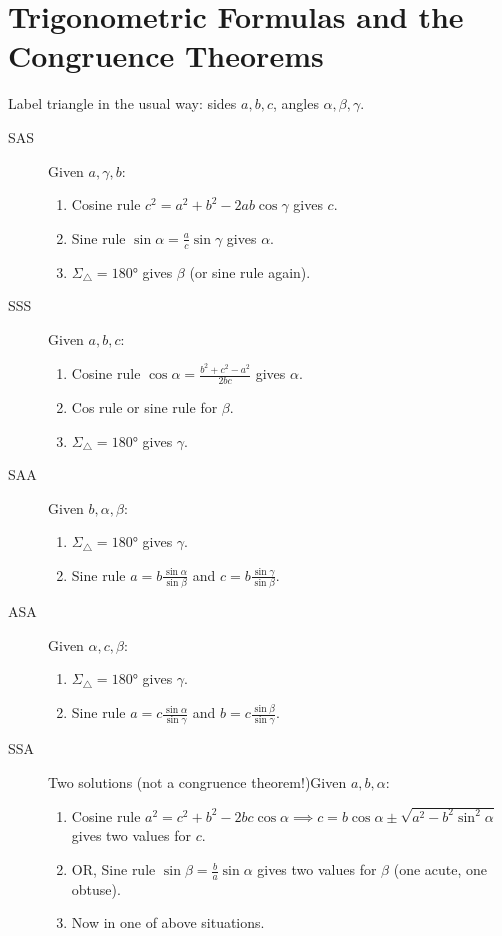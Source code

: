 \section*{Trigonometric Formulas and the Congruence Theorems}


Label triangle in the usual way: sides $a,b,c$, angles $\alpha,\beta,\gamma$.

\begin{description}
	\item[SAS] Given $a,\gamma,b$:
	\begin{enumerate}
	  \item Cosine rule $c^2=a^2+b^2-2ab\cos\gamma$ gives $c$.
	  \item Sine rule $\sin\alpha=\frac ac\sin\gamma$ gives $\alpha$.
	  \item $\Sigma_\triangle=\ang{180}$ gives $\beta$ (or sine rule again).
	\end{enumerate}
	
	\item[SSS] Given $a,b,c$:
	\begin{enumerate}
	  \item Cosine rule $\cos\alpha=\frac{b^2+c^2-a^2}{2bc}$ gives $\alpha$.
	  \item Cos rule or sine rule for $\beta$.
	  \item $\Sigma_\triangle=\ang{180}$ gives $\gamma$.
	\end{enumerate}
	
	\item[SAA] Given $b,\alpha,\beta$:
	\begin{enumerate}
	  \item $\Sigma_\triangle=\ang{180}$ gives $\gamma$.
	  \item Sine rule $a=b\frac{\sin\alpha}{\sin\beta}$ and $c=b\frac{\sin\gamma}{\sin\beta}$.
	\end{enumerate}
	
	\item[ASA] Given $\alpha,c,\beta$:
	\begin{enumerate}
	  \item $\Sigma_\triangle=\ang{180}$ gives $\gamma$.
	  \item Sine rule $a=c\frac{\sin\alpha}{\sin\gamma}$ and $b=c\frac{\sin\beta}{\sin\gamma}$.
	\end{enumerate}
	  
	\item[SSA] Two solutions (not a congruence theorem!)\lstsp Given $a,b,\alpha$:
	\begin{enumerate}
	  \item Cosine rule $a^2=c^2+b^2-2bc\cos\alpha\implies c=b\cos\alpha\pm\sqrt{a^2-b^2\sin^2\alpha}$ gives two values for $c$.
	  \item OR, Sine rule $\sin\beta=\frac ba\sin\alpha$ gives two values for $\beta$ (one acute, one obtuse).
	  \item Now in one of above situations.
	\end{enumerate}
\end{description}

